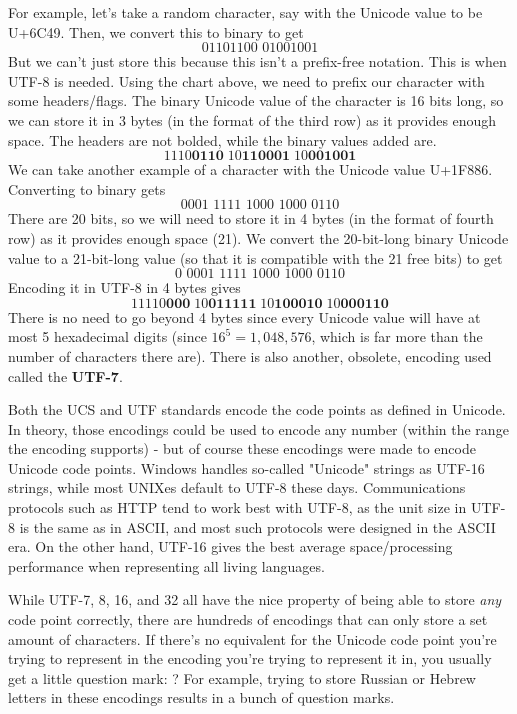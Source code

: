 \documentclass{article}
\begin{document}
  For example, let's take a random character, say with the Unicode value to be U+6C49. Then, we convert this to binary to get
  \[\text{01101100 01001001}\]
  But we can't just store this because this isn't a prefix-free notation. This is when UTF-8 is needed. Using the chart above, we need to prefix our character with some headers/flags. The binary Unicode value of the character is 16 bits long, so we can store it in 3 bytes (in the format of the third row) as it provides enough space. The headers are not bolded, while the binary values added are. 
  \[\text{1110}\textbf{0110} \; \text{10}\textbf{110001} \; \text{10}\textbf{001001}\]
  We can take another example of a character with the Unicode value U+1F886. Converting to binary gets
  \[\text{0001 1111 1000 1000 0110}\]
  There are 20 bits, so we will need to store it in 4 bytes (in the format of fourth row) as it provides enough space (21). We convert the 20-bit-long binary Unicode value to a 21-bit-long value (so that it is compatible with the 21 free bits) to get
  \[\text{0 0001 1111 1000 1000 0110}\]
  Encoding it in UTF-8 in 4 bytes gives
  \[\text{11110}\textbf{000} \; \text{10}\textbf{011111} \;  \text{10}\textbf{100010} \; \text{10}\textbf{000110}\]
  There is no need to go beyond 4 bytes since every Unicode value will have at most 5 hexadecimal digits (since $16^5 = 1,048,576$, which is far more than the number of characters there are). There is also another, obsolete, encoding used called the \textbf{UTF-7}. 

  Both the UCS and UTF standards encode the code points as defined in Unicode. In theory, those encodings could be used to encode any number (within the range the encoding supports) - but of course these encodings were made to encode Unicode code points. Windows handles so-called "Unicode" strings as UTF-16 strings, while most UNIXes default to UTF-8 these days. Communications protocols such as HTTP tend to work best with UTF-8, as the unit size in UTF-8 is the same as in ASCII, and most such protocols were designed in the ASCII era. On the other hand, UTF-16 gives the best average space/processing performance when representing all living languages. 

  While UTF-7, 8, 16, and 32 all have the nice property of being able to store \textit{any} code point correctly, there are hundreds of encodings that can only store a set amount of characters. If there’s no equivalent for the Unicode code point you’re trying to represent in the encoding you’re trying to represent it in, you usually get a little question mark: ? For example, trying to store Russian or Hebrew letters in these encodings results in a bunch of question marks. 
\end{document}
